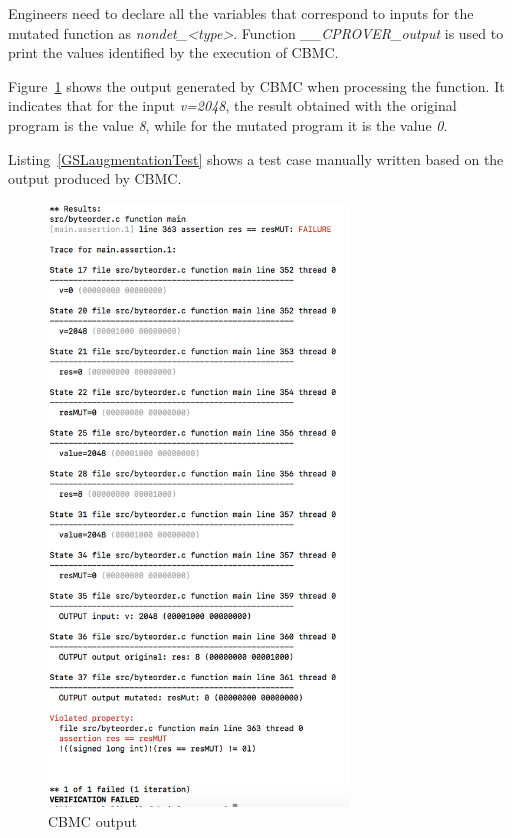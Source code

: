 Engineers need to declare all the variables that correspond to inputs for the mutated function as \emph{nondet\_<type>}. Function \emph{\_\_CPROVER\_output} is used to print the values identified by the execution of CBMC.

Figure~\ref{fig:cbmcOutput} shows the output generated by CBMC when processing the function. It indicates that for the input \emph{v=2048}, the result obtained with the original program is the value \emph{8}, while for the mutated program it is the value \emph{0}.


Listing~\ref{GSLaugmentationTest} shows a test case manually written based on the output produced by CBMC.



\begin{figure}[tb]
\begin{center}
\includegraphics[width=8cm]{images/CBMCoutput}
\caption{CBMC output}
\label{fig:cbmcOutput}
\end{center}
\end{figure}